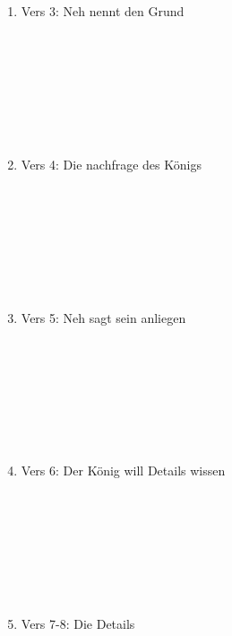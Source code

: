 \documentclass[fontsize=16pt]{mybib}
\begin{document}
\begin{enumerate}
\begin{enumerate}
            \\
            \item Vers 3: Neh nennt den Grund
            \\
            \\
            \\
            \\
            \\
            \\
            \\
            \\
            \item Vers 4: Die nachfrage des Königs
            \\
            \\
            \\
            \\
            \\
            \\
            \\
            \\
            \item Vers 5: Neh sagt sein anliegen
            \\
            \\
            \\
            \\
            \\
            \\
            \\
            \\
            \item Vers 6: Der König will Details wissen
            \\
            \\
            \\
            \\
            \\
            \\
            \\
            \\
            \item Vers 7-8: Die Details
            \\
            \\
            \\
            \\
            \\
            \\
            \\
            \\
        \end{enumerate}
    \end{enumerate}
\end{document}

